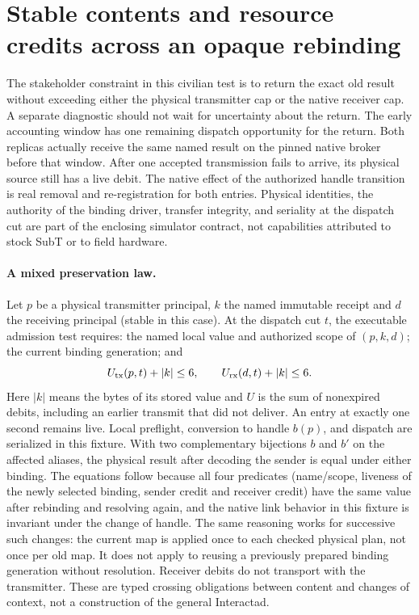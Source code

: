 \documentclass{article}
\begin{document}
\section*{Stable contents and resource credits across an opaque rebinding}
The stakeholder constraint in this civilian test is to return the
exact old result without exceeding either the physical transmitter
cap or the native receiver cap. A separate diagnostic should not
wait for uncertainty about the return. The early accounting window
has one remaining dispatch opportunity for the return. Both replicas
actually receive the same named result on the pinned native broker
before that window. After one accepted transmission fails to arrive,
its physical source still has a live debit. The native effect of
the authorized handle transition is real removal and re-registration
for both entries. Physical identities, the authority of the binding
driver, transfer integrity, and seriality at the dispatch cut are
part of the enclosing simulator contract, not capabilities attributed
to stock SubT or to field hardware.

\paragraph{A mixed preservation law.}
Let \(p\) be a physical transmitter principal, \(k\) the named immutable
receipt and \(d\) the receiving principal (stable in this case).
At the dispatch cut \(t\), the executable admission test requires:
the named local value and authorized scope of \((p,k,d)\); the current
binding generation; and
\[
   U_{\rm tx}(p,t)+|k|\leq 6,\qquad
   U_{\rm rx}(d,t)+|k|\leq 6.
\]
Here \(|k|\) means the bytes of its stored value and \(U\) is the sum
of nonexpired debits, including an earlier transmit that did not
deliver. An entry at exactly one second remains live. Local
preflight, conversion to handle \(b(p)\), and dispatch are serialized
in this fixture. With two complementary bijections \(b\) and \(b'\)
on the affected aliases, the physical result after decoding the
sender is equal under either binding. The equations follow because
all four predicates (name/scope, liveness of the newly selected
binding, sender credit and receiver credit) have the same value
after rebinding and resolving again, and the native link behavior
in this fixture is invariant under the change of handle. The same
reasoning works for successive such changes: the current map is
applied once to each checked physical plan, not once per old map.
It does not apply to reusing a previously prepared binding
generation without resolution. Receiver debits do not transport
with the transmitter. These are typed crossing obligations
between content and changes of context, not a construction of
the general Interactad.
\end{document}
